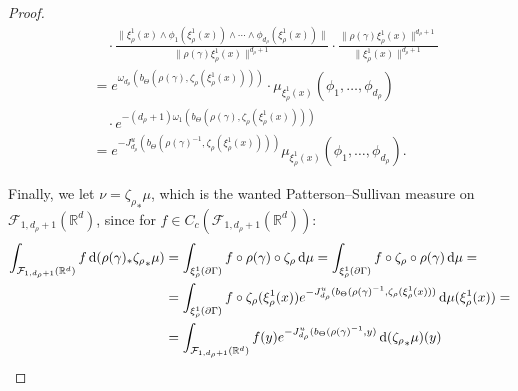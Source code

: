 \documentclass{report}
\begin{document}
\begin{proof}
\begin{align*}
        &\quad \cdot
        \frac{\|\xi_\rho^1(x) \wedge \phi_1(\xi_\rho^1(x)) \wedge \cdots \wedge \phi_{d_\rho}(\xi_\rho^1(x))\|}
        {\|\rho(\gamma) \xi_\rho^1(x)\|^{d_\rho+1}}\cdot
        \frac{\| \rho(\gamma)\xi_\rho^1(x)\|^{d_\rho+1}}{\|\xi_\rho^1(x)\|^{d_\rho+1}} \\
         &=
         e^{\omega_{d_\rho}(b_\Theta(\rho(\gamma), \zeta_\rho(\xi_\rho^1(x))))} \cdot
         \mu_{\xi_\rho^1(x)}(\phi_1, \ldots, \phi_{d_\rho}) \\
         &\quad \cdot
         e^{-(d_\rho+1)\omega_1(b_\Theta(\rho(\gamma), \zeta_\rho(\xi_\rho^1(x))))} \\
         &=
         e^{-J_{d_\rho}^u(b_\Theta(\rho(\gamma)^{-1}, \zeta_\rho(\xi_\rho^1(x))))} \mu_{\xi_\rho^1(x)}(\phi_1, \ldots, \phi_{d_\rho}).
    \end{align*}
    
    Finally, we let $\nu = {\zeta_\rho}_* \mu$, which is the wanted Patterson--Sullivan measure on $\mathcal F_{1, d_\rho + 1} (\mathbb R^d)$, since for $f \in C_c(\mathcal F_{1, d_\rho + 1} (\mathbb R^d))$:
    \begin{align*}
        \int_{\mathcal F_{1, d_\rho + 1} (\mathbb R^d)} f \,\mathrm{d}(\rho(\gamma)_* {\zeta_\rho}_* \mu) &=
        \int_{\xi_\rho^1(\partial \Gamma)} f \circ \rho(\gamma) \circ \zeta_\rho \,\mathrm{d} \mu =
        \int_{\xi_\rho^1(\partial \Gamma)} f \circ \zeta_\rho \circ \rho(\gamma) \,\mathrm{d} \mu =\\
        &=
        \int_{\xi_\rho^1(\partial \Gamma)} f \circ \zeta_\rho(\xi_\rho^1(x)) e^{-J_{d_\rho}^u(b_\Theta(\rho(\gamma)^{-1}, \zeta_\rho(\xi_\rho^1(x)))} \,\mathrm{d} \mu(\xi_\rho^1(x)) =\\
        &=
        \int_{\mathcal F_{1, d_\rho + 1} (\mathbb R^d)} 
        f(y) e^{-J_{d_\rho}^u(b_\Theta(\rho(\gamma)^{-1}, y)} \,\mathrm{d} ({\zeta_\rho}_*\mu)(y)
    \end{align*}
\end{proof}
\end{document}
